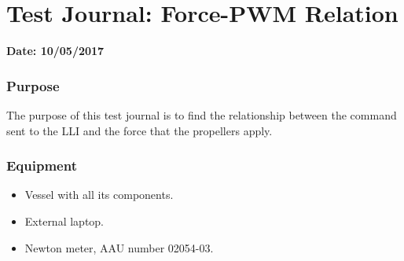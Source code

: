 \chapter{Test Journal: Force-PWM Relation}\label{app:forceTest}

\textbf{Date: 10/05/2017}

\subsection*{Purpose}
The purpose of this test journal is to find the relationship between the command sent to the LLI and the force that the propellers apply.


\subsection*{Equipment}
\begin{itemize}
	\item Vessel with all its components.
	\item External laptop.
    \item Newton meter, AAU number 02054-03.
\end{itemize}

